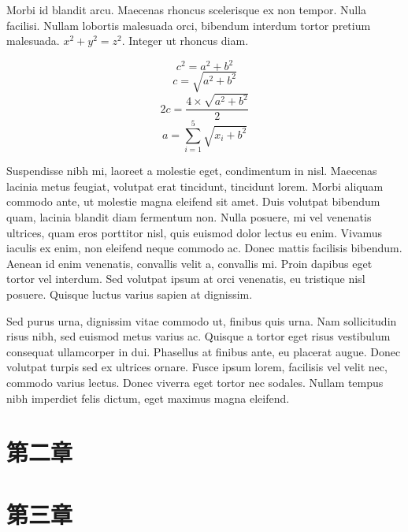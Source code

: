 \documentclass[11pt]{article}
\begin{document}
Morbi id blandit arcu. Maecenas rhoncus scelerisque ex non tempor. Nulla facilisi. Nullam lobortis malesuada orci, bibendum interdum tortor pretium malesuada. $x^2 + y^2 = z^2$. Integer ut rhoncus diam. 

\[
c^2 = a^2 + b^2
\]
\[
c = \sqrt{a^2 + b^2}
\]
\[
2c = \frac{4 \times \sqrt{a^2 + b^2}}{2}
\]
\[
a = \sum_{i = 1}^{5}{\sqrt{x_i + b^2}}
\]



Suspendisse nibh mi, laoreet a molestie eget, condimentum in nisl. Maecenas lacinia metus feugiat, volutpat erat tincidunt, tincidunt lorem. Morbi aliquam commodo ante, ut molestie magna eleifend sit amet. Duis volutpat bibendum quam, lacinia blandit diam fermentum non. Nulla posuere, mi vel venenatis ultrices, quam eros porttitor nisl, quis euismod dolor lectus eu enim. Vivamus iaculis ex enim, non eleifend neque commodo ac. Donec mattis facilisis bibendum. Aenean id enim venenatis, convallis velit a, convallis mi. Proin dapibus eget tortor vel interdum. Sed volutpat ipsum at orci venenatis, eu tristique nisl posuere. Quisque luctus varius sapien at dignissim.

Sed purus urna, dignissim vitae commodo ut, finibus quis urna. Nam sollicitudin risus nibh, sed euismod metus varius ac. Quisque a tortor eget risus vestibulum consequat ullamcorper in dui. Phasellus at finibus ante, eu placerat augue. Donec volutpat turpis sed ex ultrices ornare. Fusce ipsum lorem, facilisis vel velit nec, commodo varius lectus. Donec viverra eget tortor nec sodales.\cite{xiang2022delightlcd} Nullam tempus nibh imperdiet felis dictum, eget maximus magna eleifend. \cite{zhang2022fine}
\section{第二章}
\section{第三章}

\pagebreak


\end{document}
